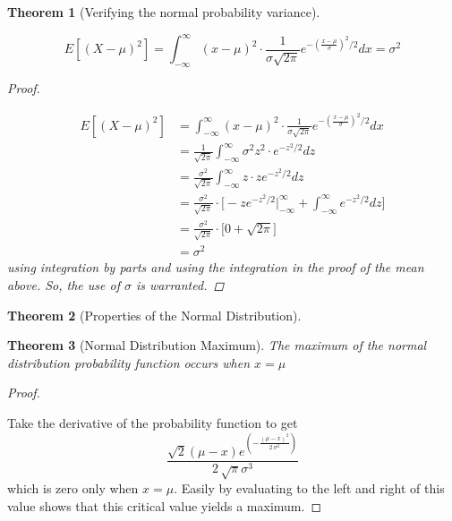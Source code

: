 \documentclass[10pt,]{book}
\theoremstyle{plain}
\newtheorem{theorem}{Theorem}[section]
\theoremstyle{definition}
\theoremstyle{definition}
\theoremstyle{definition}
\numberwithin{equation}{section}
\begin{document}
	
	\begin{theorem}[{Verifying the normal probability variance}]\label{theorem-58}

		\begin{equation*}E[(X-\mu)^2] = \int_{-\infty}^{\infty} (x-\mu)^2 \cdot \frac{1}{\sigma \sqrt{2 \pi}} e^{ - \left ( \frac{x-\mu}{\sigma} \right ) ^2 / 2} dx = \sigma^2\end{equation*}
\begin{proof}\hypertarget{proof-57}{}

	\begin{align*}
E[(X-\mu)^2] & = \int_{-\infty}^{\infty} (x-\mu)^2 \cdot \frac{1}{\sigma \sqrt{2 \pi}} e^{ - \left ( \frac{x-\mu}{\sigma} \right ) ^2 / 2} dx\\
 & = \frac{1}{\sqrt{2 \pi}} \int_{-\infty}^{\infty} \sigma^2 z^2 \cdot  e^{ -z^2 / 2} dz\\
 & = \frac{\sigma^2}{\sqrt{2 \pi}} \int_{-\infty}^{\infty} z \cdot z e^{ -z^2 / 2} dz\\
 & = \frac{\sigma^2}{\sqrt{2 \pi}} \cdot \big [ -z e^{-z^2 / 2} \big |_{-\infty}^{\infty} + \int_{-\infty}^{\infty}  e^{ -z^2 / 2}  dz \big ]\\
 & = \frac{\sigma^2}{\sqrt{2 \pi}} \cdot \big [ 0 + \sqrt{2 \pi} \big ]\\
 & = \sigma^2 
\end{align*}
	using integration by parts and using the integration in the proof of the mean above.  So, the use of \(\sigma\) is warranted.
\end{proof}
\end{theorem}

	
	\begin{theorem}[{Properties of the Normal Distribution}]\label{theorem-59}
\end{theorem}

	
	\begin{theorem}[{Normal Distribution Maximum}]\label{theorem-60}
The maximum of the normal distribution probability function occurs when \(x = \mu\)
\end{theorem}
\begin{proof}\hypertarget{proof-58}{}
Take the derivative of the probability function to get 
	\begin{equation*}\frac{\sqrt{2} {\left(\mu - x\right)} e^{\left(-\frac{{\left(\mu - x\right)}^{2}}{2 \, \sigma^{2}}\right)}}{2 \, \sqrt{\pi} \sigma^{3}}\end{equation*}
	which is zero only when \(x = \mu\).  Easily by evaluating to the left and right of this value shows that this critical value yields a maximum.
\end{proof}
\end{document}
